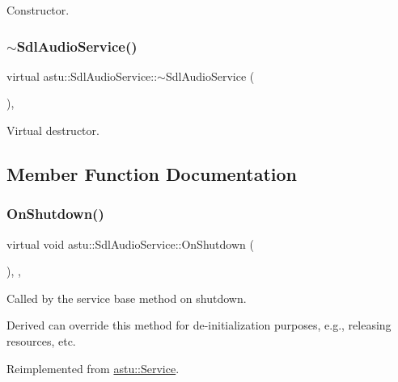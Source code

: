 Constructor. \mbox{\label{classastu_1_1SdlAudioService_a9cbceaac1e0ee494080df9b0b7b6195c}} 
\subsubsection{\texorpdfstring{$\sim$\+Sdl\+Audio\+Service()}{~SdlAudioService()}}
{\footnotesize\ttfamily virtual astu\+::\+Sdl\+Audio\+Service\+::$\sim$\+Sdl\+Audio\+Service (\begin{DoxyParamCaption}{ }\end{DoxyParamCaption})\hspace{0.3cm}{\ttfamily [inline]}, {\ttfamily [virtual]}}

Virtual destructor. 

\subsection{Member Function Documentation}
\mbox{\label{classastu_1_1SdlAudioService_a9b0b73d7de890d5fa639e5c621176128}} 
\subsubsection{\texorpdfstring{On\+Shutdown()}{OnShutdown()}}
{\footnotesize\ttfamily virtual void astu\+::\+Sdl\+Audio\+Service\+::\+On\+Shutdown (\begin{DoxyParamCaption}{ }\end{DoxyParamCaption})\hspace{0.3cm}{\ttfamily [override]}, {\ttfamily [protected]}, {\ttfamily [virtual]}}

Called by the service base method on shutdown.

Derived can override this method for de-\/initialization purposes, e.\+g., releasing resources, etc. 

Reimplemented from \hyperlink{classastu_1_1Service_a1e1dff727df791c57fae782d8a613c5f}{astu\+::\+Service}.

